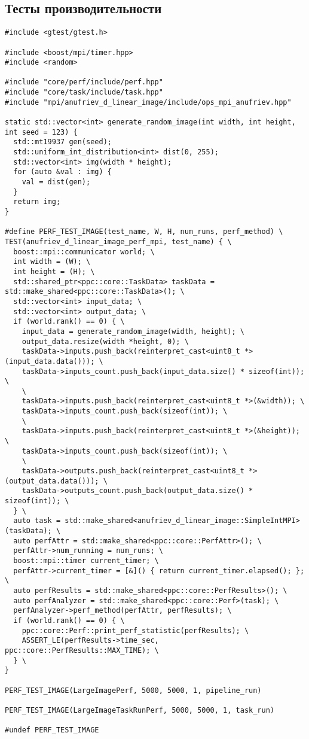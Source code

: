 \documentclass[12pt]{article}
\begin{document}
\subsection*{Тесты производительности}
\begin{lstlisting}
#include <gtest/gtest.h>

#include <boost/mpi/timer.hpp>
#include <random>

#include "core/perf/include/perf.hpp"
#include "core/task/include/task.hpp"
#include "mpi/anufriev_d_linear_image/include/ops_mpi_anufriev.hpp"

static std::vector<int> generate_random_image(int width, int height, int seed = 123) {
  std::mt19937 gen(seed);
  std::uniform_int_distribution<int> dist(0, 255);
  std::vector<int> img(width * height);
  for (auto &val : img) {
    val = dist(gen);
  }
  return img;
}

#define PERF_TEST_IMAGE(test_name, W, H, num_runs, perf_method) \
TEST(anufriev_d_linear_image_perf_mpi, test_name) { \
  boost::mpi::communicator world; \
  int width = (W); \
  int height = (H); \
  std::shared_ptr<ppc::core::TaskData> taskData = std::make_shared<ppc::core::TaskData>(); \
  std::vector<int> input_data; \
  std::vector<int> output_data; \
  if (world.rank() == 0) { \
    input_data = generate_random_image(width, height); \
    output_data.resize(width *height, 0); \
    taskData->inputs.push_back(reinterpret_cast<uint8_t *>(input_data.data())); \
    taskData->inputs_count.push_back(input_data.size() * sizeof(int)); \
    \
    taskData->inputs.push_back(reinterpret_cast<uint8_t *>(&width)); \
    taskData->inputs_count.push_back(sizeof(int)); \
    \
    taskData->inputs.push_back(reinterpret_cast<uint8_t *>(&height)); \
    taskData->inputs_count.push_back(sizeof(int)); \
    \
    taskData->outputs.push_back(reinterpret_cast<uint8_t *>(output_data.data())); \
    taskData->outputs_count.push_back(output_data.size() * sizeof(int)); \
  } \
  auto task = std::make_shared<anufriev_d_linear_image::SimpleIntMPI>(taskData); \
  auto perfAttr = std::make_shared<ppc::core::PerfAttr>(); \
  perfAttr->num_running = num_runs; \
  boost::mpi::timer current_timer; \
  perfAttr->current_timer = [&]() { return current_timer.elapsed(); }; \
  auto perfResults = std::make_shared<ppc::core::PerfResults>(); \
  auto perfAnalyzer = std::make_shared<ppc::core::Perf>(task); \
  perfAnalyzer->perf_method(perfAttr, perfResults); \
  if (world.rank() == 0) { \
    ppc::core::Perf::print_perf_statistic(perfResults); \
    ASSERT_LE(perfResults->time_sec, ppc::core::PerfResults::MAX_TIME); \
  } \
}

PERF_TEST_IMAGE(LargeImagePerf, 5000, 5000, 1, pipeline_run)

PERF_TEST_IMAGE(LargeImageTaskRunPerf, 5000, 5000, 1, task_run)

#undef PERF_TEST_IMAGE
\end{lstlisting}
\end{document}
